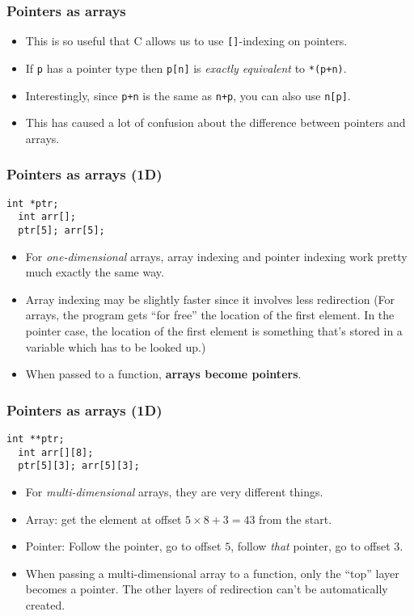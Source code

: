 \begin{frame}[fragile]
  \frametitle{Pointers as arrays}
  \begin{itemize}
  \item This is so useful that C allows us to use \texttt{[]}-indexing on
    pointers.
  \item If \texttt{p} has a pointer type then \texttt{p[n]} is
    \emph{exactly equivalent} to \texttt{*(p+n)}.
  \item Interestingly, since \texttt{p+n} is the same as \texttt{n+p}, you can
    also use \texttt{n[p]}.
  \item This has caused a lot of confusion about the difference between pointers
    and arrays.
  \end{itemize}
\end{frame}

\begin{frame}[fragile]
  \frametitle{Pointers as arrays (1D)}
\begin{lstlisting}[style=c]
  int *ptr;
  int arr[];
  ptr[5]; arr[5];
\end{lstlisting}
  \begin{itemize}
  \item For \emph{one-dimensional} arrays, array indexing and pointer indexing
    work pretty much exactly the same way.
  \item Array indexing may be slightly faster since it involves less redirection
    (For arrays, the program gets ``for free'' the location of the first
    element. In the pointer case, the location of the first element is something
    that's stored in a variable which has to be looked up.)
  \item When passed to a function, \textbf{arrays become pointers}.
  \end{itemize}
\end{frame}

\begin{frame}[fragile]
  \frametitle{Pointers as arrays (1D)}
\begin{lstlisting}[style=c]
  int **ptr;
  int arr[][8];
  ptr[5][3]; arr[5][3];
\end{lstlisting}
  \begin{itemize}
  \item For \emph{multi-dimensional} arrays, they are very different things.
  \item Array: get the element at offset $5\times8 + 3 = 43$ from the start.
  \item Pointer: Follow the pointer, go to offset $5$, follow \emph{that}
    pointer, go to offset $3$.
  \item When passing a multi-dimensional array to a function, only the ``top''
    layer becomes a pointer. The other layers of redirection can't be
    automatically created.
  \end{itemize}
\end{frame}

